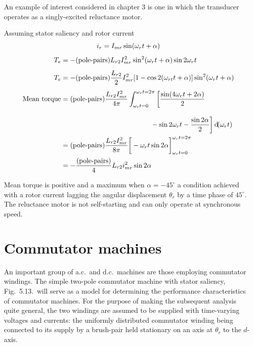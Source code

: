 \documentclass[a4paper,numbers=noenddot,12pt]{scrbook}
\begin{document}
    An example of interest considered in chapter 3 is one in which the transducer operates as a singly-excited reluctance motor.

    Assuming stator saliency and rotor current
    \begin{gather*} \label{eq:EqSect5.3}
        i_r = I_{mr} \sin (\omega_r t + \alpha) \\[1ex]
        \begin{aligned}
            T_e & = -(\text{pole-pairs}) L_{r2} I_{mr}^2 \sin^2(\omega_r t + \alpha) \sin 2 \omega_r t \\[1ex]
            T_e & = -(\text{pole-pairs}) \frac{L_{r2}}{2} I_{mr}^2 [1 - \cos 2 (\omega_{rt} t + \alpha)] \sin^2(\omega_r t + \alpha) \\[1ex]
            \text{Mean torque} & = (\text{pole-pairs}) \frac{L_{r2} I_{mr}^2}{4 \pi} \int_{\omega_r t = 0}^{\omega_r t = 2 \pi} \bigg [ \frac{\sin (4 \omega_r t + 2 \alpha)}{2} \\[2ex]
        & \hspace{13em}  -\sin 2 \omega_r t - \frac{\sin 2 \alpha}{2} \bigg ] \dif (\omega_r t) \\
        & = {(\text{pole-pairs})} \frac{L_{r2} I_{mr}^2}{8 \pi} {\bigg [ -\omega_r t \sin 2 \alpha \bigg ]}_{\omega_r t = 0}^{\omega_r t = 2 \pi} \\
        & = - \frac{(\text{pole-pairs})}{4} L_{r2} i_{mr}^2 \sin 2 \alpha
    \end{aligned}
\end{gather*}

Mean torque is positive and a maximum when $\alpha = -45^{\circ}$ a condition achieved with a rotor current lagging the angular displacement $\theta_r$ by a time phase of $45^{\circ}$. The reluctance motor is not self-starting and can only operate at synchronous speed.

\section{Commutator machines}
An important group of a.c.\ and d.c.\ machines are those employing commutator windings. The simple two-pole commutator machine with stator saliency, Fig.\ 5.13.\ will serve as a model for determining the performance characteristics of commutator machines. For the purpose of making the subsequent analysis quite general, the two windings are assumed to be supplied with time-varying voltages and currents: the uniformly distributed commutator winding being connected to its supply by a brush-pair held stationary on an axis at $\theta_r$ to the $d$-axis.
\end{document}
